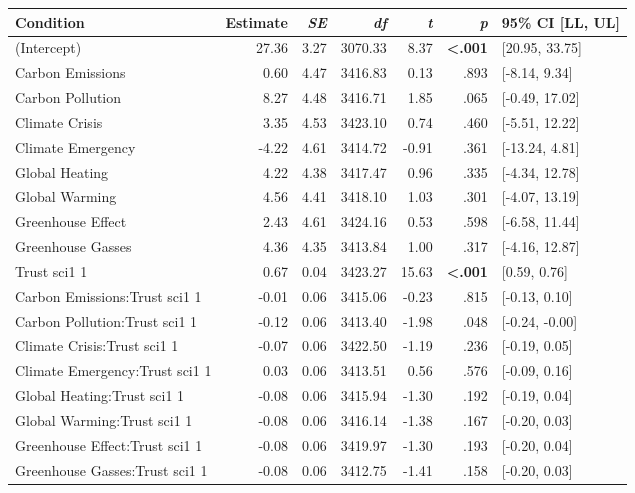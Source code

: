 \begin{table}[ht]
\centering
\begin{tabular}{lrrrrrl}
  \hline
Condition & Estimate & \textit{SE} & \textit{df} & \textit{t} & \textit{p} & 95\% CI [LL, UL] \\ 
  \hline
(Intercept) & 27.36 & 3.27 & 3070.33 & 8.37 & \textbf{\textless  .001} & [20.95, 33.75] \\ 
  Carbon Emissions & 0.60 & 4.47 & 3416.83 & 0.13 & .893 & [-8.14, 9.34] \\ 
  Carbon Pollution & 8.27 & 4.48 & 3416.71 & 1.85 & .065 & [-0.49, 17.02] \\ 
  Climate Crisis & 3.35 & 4.53 & 3423.10 & 0.74 & .460 & [-5.51, 12.22] \\ 
  Climate Emergency & -4.22 & 4.61 & 3414.72 & -0.91 & .361 & [-13.24, 4.81] \\ 
  Global Heating & 4.22 & 4.38 & 3417.47 & 0.96 & .335 & [-4.34, 12.78] \\ 
  Global Warming & 4.56 & 4.41 & 3418.10 & 1.03 & .301 & [-4.07, 13.19] \\ 
  Greenhouse Effect & 2.43 & 4.61 & 3424.16 & 0.53 & .598 & [-6.58, 11.44] \\ 
  Greenhouse Gasses & 4.36 & 4.35 & 3413.84 & 1.00 & .317 & [-4.16, 12.87] \\ 
  Trust sci1 1 & 0.67 & 0.04 & 3423.27 & 15.63 & \textbf{\textless  .001} & [0.59, 0.76] \\ 
  Carbon Emissions:Trust sci1 1 & -0.01 & 0.06 & 3415.06 & -0.23 & .815 & [-0.13, 0.10] \\ 
  Carbon Pollution:Trust sci1 1 & -0.12 & 0.06 & 3413.40 & -1.98 & .048 & [-0.24, -0.00] \\ 
  Climate Crisis:Trust sci1 1 & -0.07 & 0.06 & 3422.50 & -1.19 & .236 & [-0.19, 0.05] \\ 
  Climate Emergency:Trust sci1 1 & 0.03 & 0.06 & 3413.51 & 0.56 & .576 & [-0.09, 0.16] \\ 
  Global Heating:Trust sci1 1 & -0.08 & 0.06 & 3415.94 & -1.30 & .192 & [-0.19, 0.04] \\ 
  Global Warming:Trust sci1 1 & -0.08 & 0.06 & 3416.14 & -1.38 & .167 & [-0.20, 0.03] \\ 
  Greenhouse Effect:Trust sci1 1 & -0.08 & 0.06 & 3419.97 & -1.30 & .193 & [-0.20, 0.04] \\ 
  Greenhouse Gasses:Trust sci1 1 & -0.08 & 0.06 & 3412.75 & -1.41 & .158 & [-0.20, 0.03] \\ 
   \hline
\end{tabular}
\end{table}
